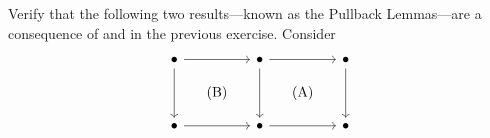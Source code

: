 \begin{exercise}
Verify that the following two results---known as the Pullback Lemmas---are
a consequence of  and  in the previous exercise.
Consider
\begin{equation*}
\begin{tikzcd}[row sep=small, column sep=small]
\bullet \arrow[rr] \arrow[dd] && \bullet \arrow[rr] \arrow[dd] && \bullet \arrow[dd] \\
& (\mathrm{B}) && (\mathrm{A}) \\
\bullet \arrow[rr] && \bullet \arrow[rr] && \bullet \\
\end{tikzcd}
\end{equation*}
\end{exercise}

